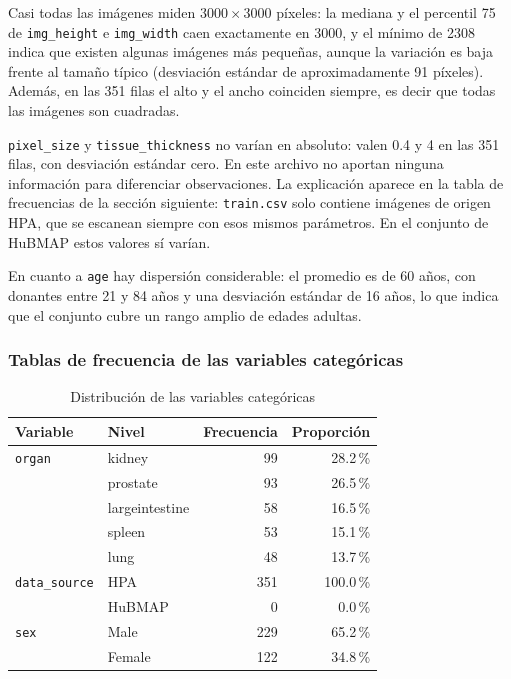 \documentclass[11pt,letterpaper]{article}
\begin{document}
Casi todas las imágenes miden $3000 \times 3000$ píxeles: la mediana y el percentil 75 de
\texttt{img\_height} e \texttt{img\_width} caen exactamente en 3000, y el mínimo de 2308 indica que
existen algunas imágenes más pequeñas, aunque la variación es baja frente al tamaño típico
(desviación estándar de aproximadamente 91 píxeles). Además, en las 351 filas el alto y el ancho
coinciden siempre, es decir que todas las imágenes son cuadradas.

\texttt{pixel\_size} y \texttt{tissue\_thickness} no varían en absoluto: valen 0.4 y 4 en las 351
filas, con desviación estándar cero. En este archivo no aportan ninguna información para diferenciar
observaciones. La explicación aparece en la tabla de frecuencias de la sección siguiente:
\texttt{train.csv} solo contiene imágenes de origen HPA, que se escanean siempre con esos mismos
parámetros. En el conjunto de HuBMAP estos valores sí varían.

En cuanto a \texttt{age} hay dispersión considerable: el promedio es de 60 años, con donantes entre
21 y 84 años y una desviación estándar de 16 años, lo que indica que el conjunto cubre un rango
amplio de edades adultas.

\subsubsection{Tablas de frecuencia de las variables categóricas}

\begin{table}[H]
\centering
\caption{Distribución de las variables categóricas}
\begin{tabular}{llrr}
\toprule
\textbf{Variable} & \textbf{Nivel} & \textbf{Frecuencia} & \textbf{Proporción} \\
\midrule
\texttt{organ} & kidney         & 99 & 28.2\,\% \\
               & prostate       & 93 & 26.5\,\% \\
               & largeintestine & 58 & 16.5\,\% \\
               & spleen         & 53 & 15.1\,\% \\
               & lung           & 48 & 13.7\,\% \\
\midrule
\texttt{data\_source} & HPA    & 351 & 100.0\,\% \\
                      & HuBMAP &   0 &   0.0\,\% \\
\midrule
\texttt{sex} & Male   & 229 & 65.2\,\% \\
             & Female & 122 & 34.8\,\% \\
\bottomrule
\end{tabular}
\end{table}
\end{document}
